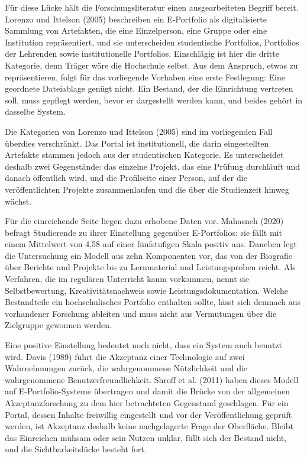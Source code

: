 Für diese Lücke hält die Forschungsliteratur einen ausgearbeiteten Begriff bereit. Lorenzo und Ittelson (2005) beschreiben ein E-Portfolio als digitalisierte Sammlung von Artefakten, die eine Einzelperson, eine Gruppe oder eine Institution repräsentiert, und sie unterscheiden studentische Portfolios, Portfolios der Lehrenden sowie institutionelle Portfolios. Einschlägig ist hier die dritte Kategorie, denn Träger wäre die Hochschule selbst. Aus dem Anspruch, etwas zu repräsentieren, folgt für das vorliegende Vorhaben eine erste Festlegung: Eine geordnete Dateiablage genügt nicht. Ein Bestand, der die Einrichtung vertreten soll, muss gepflegt werden, bevor er dargestellt werden kann, und beides gehört in dasselbe System.

Die Kategorien von Lorenzo und Ittelson (2005) sind im vorliegenden Fall überdies verschränkt. Das Portal ist institutionell, die darin eingestellten Artefakte stammen jedoch aus der studentischen Kategorie. Es unterscheidet deshalb zwei Gegenstände: das einzelne Projekt, das eine Prüfung durchläuft und danach öffentlich wird, und die Profilseite einer Person, auf der die veröffentlichten Projekte zusammenlaufen und die über die Studienzeit hinweg wächst.

Für die einreichende Seite liegen dazu erhobene Daten vor. Mahasneh (2020) befragt Studierende zu ihrer Einstellung gegenüber E-Portfolios; sie fällt mit einem Mittelwert von 4,58 auf einer fünfstufigen Skala positiv aus. Daneben legt die Untersuchung ein Modell aus zehn Komponenten vor, das von der Biografie über Berichte und Projekte bis zu Lernmaterial und Leistungsproben reicht. Als Verfahren, die im regulären Unterricht kaum vorkommen, nennt sie Selbstbewertung, Kreativitätsnachweis sowie Leistungsdokumentation. Welche Bestandteile ein hochschulisches Portfolio enthalten sollte, lässt sich demnach aus vorhandener Forschung ableiten und muss nicht aus Vermutungen über die Zielgruppe gewonnen werden.

Eine positive Einstellung bedeutet noch nicht, dass ein System auch benutzt wird. Davis (1989) führt die Akzeptanz einer Technologie auf zwei Wahrnehmungen zurück, die wahrgenommene Nützlichkeit und die wahrgenommene Benutzerfreundlichkeit. Shroff et al. (2011) haben dieses Modell auf E-Portfolio-Systeme übertragen und damit die Brücke von der allgemeinen Akzeptanzforschung zu dem hier betrachteten Gegenstand geschlagen. Für ein Portal, dessen Inhalte freiwillig eingestellt und vor der Veröffentlichung geprüft werden, ist Akzeptanz deshalb keine nachgelagerte Frage der Oberfläche. Bleibt das Einreichen mühsam oder sein Nutzen unklar, füllt sich der Bestand nicht, und die Sichtbarkeitslücke besteht fort.

